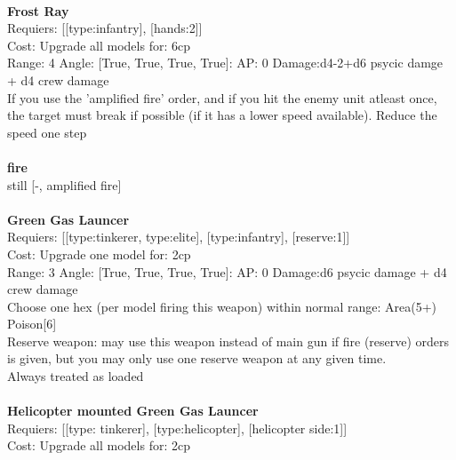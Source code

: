 \ \\
{\bf Frost Ray } \\

Requiers: [[type:infantry], [hands:2]] \\
Cost: Upgrade all models for: 6cp \\


Range: 4  Angle: [True, True, True, True]: AP: 0 Damage:d4-2+d6 psycic damge + d4 crew damage \\
If you use the 'amplified fire' order, and if you hit the enemy unit atleast once, the target must break if possible (if it has a lower speed available). Reduce the speed one step\\ 







\ \\ {\bf fire } \\
still [-, amplified fire] \\

\ \\
{\bf Green Gas Launcer } \\

Requiers: [[type:tinkerer, type:elite], [type:infantry], [reserve:1]] \\
Cost: Upgrade one model for: 2cp \\


Range: 3  Angle: [True, True, True, True]: AP: 0 Damage:d6 psycic damage + d4 crew damage \\
Choose one hex (per model firing this weapon) within normal range: Area(5+)\\ 
Poison[6]\\ 
Reserve weapon: may use this weapon instead of main gun if fire (reserve) orders is given, but you may only use one reserve weapon at any given time.\\ 
Always treated as loaded\\ 








\ \\
{\bf Helicopter mounted Green Gas Launcer } \\

Requiers: [[type: tinkerer], [type:helicopter], [helicopter side:1]] \\
Cost: Upgrade all models for: 2cp \\


